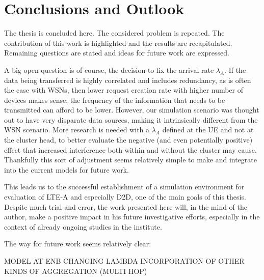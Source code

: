 \chapter{Conclusions and Outlook}

The thesis is concluded here. The considered problem is repeated. The contribution of this work is highlighted and the results are recapitulated. Remaining questions are stated and ideas for future work are expressed. 




A big open question is of course, the decision to fix the arrival rate $\lambda_A$. If the data being transferred is highly correlated and includes redundancy, as is often the case with WSNs, then lower request creation rate with higher number of devices makes sense: the frequency of the information that needs to be transmitted can afford to be lower. However, our simulation scenario was thought out to have very disparate data sources, making it intrinsically different from the WSN scenario. More research is needed with a $\lambda_A$ defined at the UE and not at the cluster head, to better evaluate the negative (and even potentially positive) effect that increased interference both within and without the cluster may cause. Thankfully this sort of adjustment seems relatively simple to make and integrate into the current models for future work. 

This leads us to the successful establishment of a simulation environment for evaluation of LTE-A and especially D2D, one of the main goals of this thesis. Despite much trial and error, the work presented here will, in the mind of the author, make a positive impact in his future investigative efforts, especially in the context of already ongoing studies in the institute.

The way for future work seems relatively clear:

MODEL AT ENB
CHANGING LAMBDA
INCORPORATION OF OTHER KINDS OF AGGREGATION (MULTI HOP)